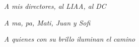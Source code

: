 \vspace*{\fill}

\hfill\textit{A mis directores, al LIAA, al DC}

\hfill\textit{A ma, pa, Mati, Juan y Sofi}

\hfill\textit{A quienes con su brillo iluminan el camino}
